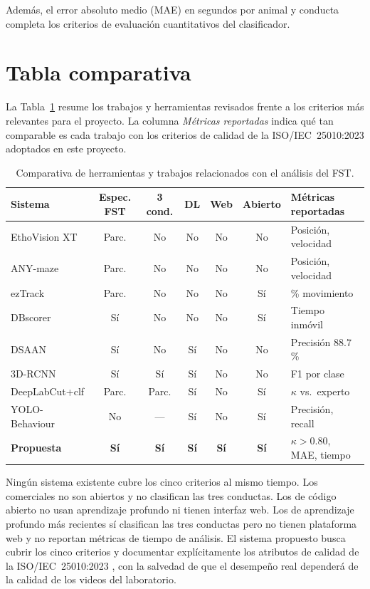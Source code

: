 Además, el error absoluto medio (MAE) en segundos por animal y conducta completa los
criterios de evaluación cuantitativos del clasificador.

\section{Tabla comparativa}

La Tabla~\ref{tab:comparativa_herramientas} resume los trabajos y herramientas
revisados frente a los criterios más relevantes para el proyecto. La columna
\textit{Métricas reportadas} indica qué tan comparable es cada trabajo con los
criterios de calidad de la ISO/IEC~25010:2023 \cite{iso25010} adoptados en este
proyecto.

\begin{table}[ht]
\centering
\caption{Comparativa de herramientas y trabajos relacionados con el análisis del FST.}
\label{tab:comparativa_herramientas}
\small
\begin{tabular}{lcccccp{3.0cm}}
\hline
\textbf{Sistema} & \textbf{Espec. FST} & \textbf{3 cond.} & \textbf{DL} & \textbf{Web} & \textbf{Abierto} & \textbf{Métricas reportadas} \\
\hline
EthoVision XT  & Parc. & No    & No  & No  & No  & Posición, velocidad \\
ANY-maze       & Parc. & No    & No  & No  & No  & Posición, velocidad \\
ezTrack        & Parc. & No    & No  & No  & Sí  & \% movimiento \\
DBscorer       & Sí    & No    & No  & No  & Sí  & Tiempo inmóvil \\
DSAAN          & Sí    & No    & Sí  & No  & No  & Precisión 88.7\,\% \\
3D-RCNN        & Sí    & Sí    & Sí  & No  & No  & F1 por clase \\
DeepLabCut+clf & Parc. & Parc. & Sí  & No  & Sí  & $\kappa$ vs.\ experto \\
YOLO-Behaviour & No    & ---   & Sí  & No  & Sí  & Precisión, recall \\
\hline
\textbf{Propuesta} & \textbf{Sí} & \textbf{Sí} & \textbf{Sí} & \textbf{Sí} & \textbf{Sí} & $\kappa > 0.80$, MAE, tiempo \\
\hline
\end{tabular}
\end{table}

Ningún sistema existente cubre los cinco criterios al mismo tiempo. Los comerciales no
son abiertos y no clasifican las tres conductas. Los de código abierto no usan
aprendizaje profundo ni tienen interfaz web. Los de aprendizaje profundo más recientes
sí clasifican las tres conductas pero no tienen plataforma web y no reportan métricas
de tiempo de análisis. El sistema propuesto busca cubrir los cinco criterios y
documentar explícitamente los atributos de calidad de la ISO/IEC~25010:2023
\cite{iso25010}, con la salvedad de que el desempeño real dependerá de la calidad de
los videos del laboratorio.
